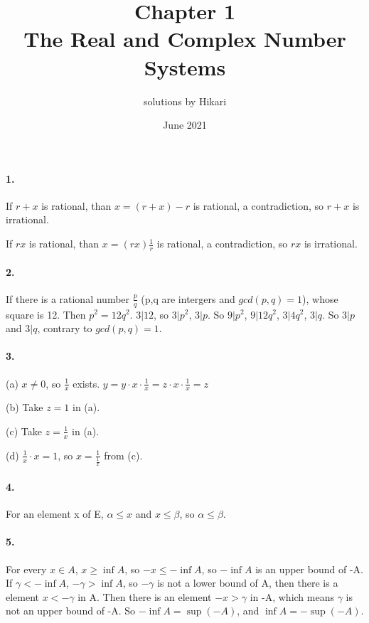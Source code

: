 \documentclass[a4paper]{article}
\title{Chapter 1\\ The Real and Complex Number Systems}
\author{solutions by Hikari}
\date{June 2021}
\begin{document}
\maketitle

\newcommand{\V}{\mathbf}

\paragraph{1.}
If $r+x$ is rational, than $x=(r+x)-r$ is rational, a contradiction, so $r+x$ is irrational.

If $rx$ is rational, than $x=(rx)\frac{1}{r}$ is rational, a contradiction, so $rx$ is irrational.

\paragraph{2.}
If there is a rational number $\frac{p}{q}$ (p,q are intergers and $gcd(p,q)=1$), whose square is 12. Then $p^2=12q^2$. $3|12$, so $3|p^2$, $3|p$. So $9|p^2$, $9|12q^2$, $3|4q^2$, $3|q$. So $3|p$ and $3|q$, contrary to $gcd(p,q)=1$.

\paragraph{3.}
(a) $x\neq0$, so $\frac{1}{x}$ exists. $y=y\cdot x\cdot \frac{1}{x}=z\cdot x\cdot \frac{1}{x}=z$

(b) Take $z=1$ in (a).

(c) Take $z=\frac{1}{x}$ in (a).

(d) $\frac{1}{x}\cdot x=1$, so $x=\frac{1}{\frac{1}{x}}$ from (c).

\paragraph{4.}
For an element x of E, $\alpha\leq x $ and $x\leq \beta$, so $\alpha \leq\beta$.

\paragraph{5.}
For every $x\in A$, $x\geq \inf A$, so $-x\leq -\inf A$, so $-\inf A$ is an upper bound of -A. If $\gamma<-\inf A$, $-\gamma >\inf A$, so $-\gamma$ is not a lower bound of A, then there is a element $x<-\gamma$ in A. Then there is an element $-x>\gamma$ in -A, which means $\gamma$ is not an upper bound of -A. So $-\inf A=\sup (-A)$, and $\inf A=-\sup (-A)$.
\end{document}
